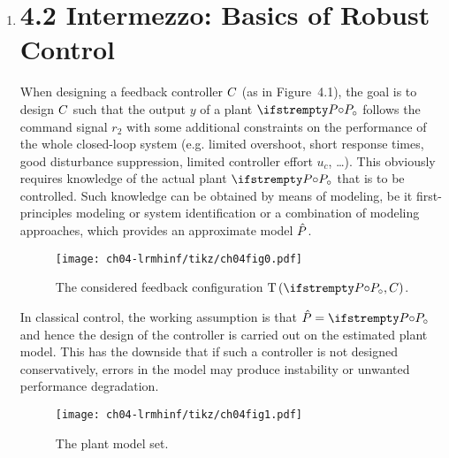 \documentclass{responseletter}
\begin{document}
\begin{enumerate}
  \item 
  \begin{newquote}
  \section{4.2 Intermezzo: Basics of Robust Control}
\label{sec:lrmhinf:robust-control-basics}
When designing a feedback controller $C$ (as in Figure~4.1), the goal is to design $C$ such that the output $y$ of a plant $\true{\Plant}$ follows the command signal $r_2$ with some additional constraints on the performance of the whole closed-loop system (e.g. limited overshoot, short response times, good disturbance suppression, limited controller effort $u_c$, \ldots).
This obviously requires knowledge of the actual plant $\true{\Plant}$ that is to be controlled.
Such knowledge can be obtained by means of modeling, be it first-principles modeling or system identification or a combination of modeling approaches, which provides an approximate model $\hat{P}$.

\begin{figure}
 \centering
 \texttt{[image: ch04-lrmhinf/tikz/ch04fig0.pdf]}
 \caption[4.1]{The considered feedback configuration $\ClosedLoop{\true{\Plant},\Controller}$.}
 \label{fig:lrmhinf:tpc:nominal}
\end{figure}

In classical control, the working assumption is that $\estimated{\Plant} = \true{\Plant}$ and hence the design of the controller is carried out on the estimated plant model.
This has the downside that if such a controller is not designed conservatively, errors in the model may produce instability or unwanted performance degradation.

\begin{figure}%
  \centering
  \texttt{[image: ch04-lrmhinf/tikz/ch04fig1.pdf]}
  \caption[4.2]{The plant model set.}
  \label{fig:lrmhinf:modelset}
\end{figure}


\end{newquote}
\end{enumerate}
\end{document}
